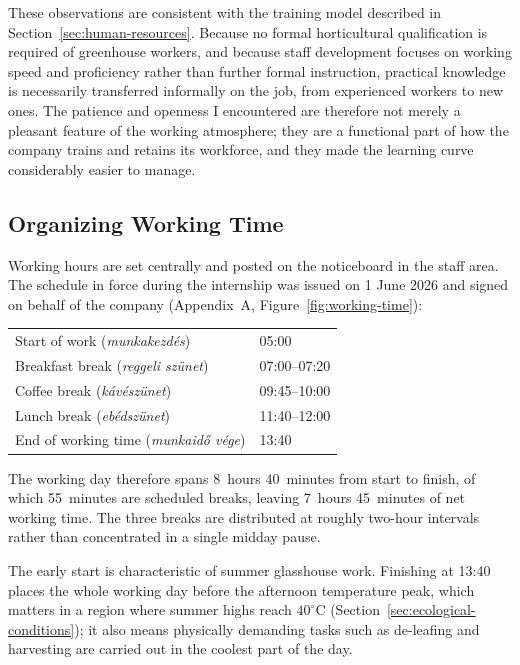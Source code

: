 These observations are consistent with the training model described in Section~\ref{sec:human-resources}. Because no formal horticultural qualification is required of greenhouse workers, and because staff development focuses on working speed and proficiency rather than further formal instruction, practical knowledge is necessarily transferred informally on the job, from experienced workers to new ones. The patience and openness I encountered are therefore not merely a pleasant feature of the working atmosphere; they are a functional part of how the company trains and retains its workforce, and they made the learning curve considerably easier to manage.

\subsection{Organizing Working Time}
\label{sec:working-time}
Working hours are set centrally and posted on the noticeboard in the staff area. The schedule in force during the internship was issued on 1 June 2026 and signed on behalf of the company (Appendix~A, Figure~\ref{fig:working-time}):

\begin{center}
\begin{tabular}{ll}
    \toprule
    Start of work (\emph{munkakezdés}) & 05:00 \\
    Breakfast break (\emph{reggeli szünet}) & 07:00--07:20 \\
    Coffee break (\emph{kávészünet}) & 09:45--10:00 \\
    Lunch break (\emph{ebédszünet}) & 11:40--12:00 \\
    End of working time (\emph{munkaidő vége}) & 13:40 \\
    \bottomrule
\end{tabular}
\end{center}

The working day therefore spans 8~hours 40~minutes from start to finish, of which 55~minutes are scheduled breaks, leaving 7~hours 45~minutes of net working time. The three breaks are distributed at roughly two-hour intervals rather than concentrated in a single midday pause.

The early start is characteristic of summer glasshouse work. Finishing at 13:40 places the whole working day before the afternoon temperature peak, which matters in a region where summer highs reach $40^{\circ}\mathrm{C}$ (Section~\ref{sec:ecological-conditions}); it also means physically demanding tasks such as de-leafing and harvesting are carried out in the coolest part of the day.
